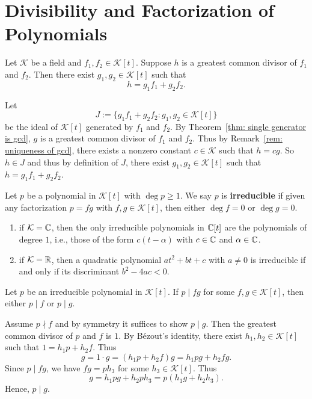 \section{Divisibility and Factorization of Polynomials}
\begin{corollaryenv}
    Let $\mathcal K$ be a field and $f_1, f_2 \in \mathcal K[t]$. Suppose $h$ is a greatest common divisor of $f_1$ and $f_2$. Then there exist $g_1, g_2 \in \mathcal K[t]$ such that $$h = g_1 f_1 + g_2 f_2.$$
\end{corollaryenv}
\begin{proofenv}
    Let
    $$ J := \{ g_1 f_1 + g_2 f_2 : g_1, g_2 \in \mathcal K[t] \} $$
    be the ideal of $\mathcal K[t]$ generated by $f_1$ and $f_2$. By Theorem~\ref{thm: single generator is gcd}, $g$ is a greatest common divisor of $f_1$ and $f_2$. Thus by Remark~\ref{rem: uniqueness of gcd}, there exists a nonzero constant $c\in \mathcal K$ such that $h = cg$. So $h\in J$ and thus by definition of $J$, there exist $g_1, g_2 \in \mathcal K[t]$ such that $h = g_1 f_1 + g_2 f_2$.
\end{proofenv}
\begin{definitionenv}
    Let $p$ be a polynomial in $\mathcal K[t]$ with $\deg p \ge 1$. We say $p$ is \textbf{irreducible} if given any factorization $p = fg$ with $f,g \in \mathcal K[t]$, then either $\deg f = 0$ or $\deg g = 0$.
\end{definitionenv}
\begin{exampleenv}
    \begin{enumerate}[label=(\arabic*)]
        \item if $\mathcal K = \mathbb{C}$, then the only irreducible polynomials in $\mathbb{C}[t]$ are the polynomials of degree $1$, i.e., those of the form $c (t - \alpha)$ with $c\in \mathbb{C}$ and $\alpha \in \mathbb{C}$.
        \item if $\mathcal K = \mathbb{R}$, then a quadratic polynomial $at^2 + bt + c$ with $a\ne 0$ is irreducible if and only if its discriminant $b^2 - 4ac < 0$.
    \end{enumerate}
\end{exampleenv}
\begin{lemmaenv}
    Let $p$ be an irreducible polynomial in $\mathcal K[t]$. If $p \mid fg$ for some $f,g \in \mathcal K[t]$, then either $p \mid f$ or $p \mid g$.
\end{lemmaenv}
\begin{proofenv}
    Assume $p \nmid f$ and by symmetry it suffices to show $p \mid g$. Then the greatest common divisor of $p$ and $f$ is $1$. By Bézout's identity, there exist $h_1, h_2 \in \mathcal K[t]$ such that $1 = h_1 p + h_2 f$. Thus
    $$ g = 1 \cdot g = (h_1 p + h_2 f) g = h_1 p g + h_2 f g. $$
    Since $p \mid fg$, we have $fg = p h_3$ for some $h_3 \in \mathcal K[t]$. Thus
    $$ g = h_1 p g + h_2 p h_3 = p (h_1 g + h_2 h_3). $$
    Hence, $p \mid g$.
\end{proofenv}
